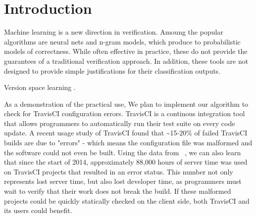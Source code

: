\section{Introduction}

Machine learning is a new direction in verification\cite{Santolucito2016,ETH_Guy}.
Amoung the popular algorithms are neural nets and n-gram models, which produce to probabilistic models of correctness.
While often effective in practice, these do not provide the guarantees of a traditional verification approach.
In addition, these tools are not designed to provide simple justifications for their classification outputs.

Version space learning \cite{lau2000version}.

As a demonstration of the practical use, We plan to implement our algorithm to check for TravisCI configuration errors.
TravisCI is a continous integration tool that allows programmers to automatically run their test suite on every code update.
A recent usage study of TravisCI found that \textasciitilde 15-20\% of failed TravisCI builds are due to "errors" - which means the configuration file was malformed and the software could not even be built\cite{API}.
Using the data from ~\cite{API}, we can also learn that since the start of 2014, approximately 88,000 hours of server time was used on TravisCI projects that resulted in an error status.
This number not only represents lost server time, but also lost developer time, as programmers must wait to verify that their work does not break the build.
If these malformed projects could be quickly statically checked on the client side, both TravisCI and its users could benefit.

